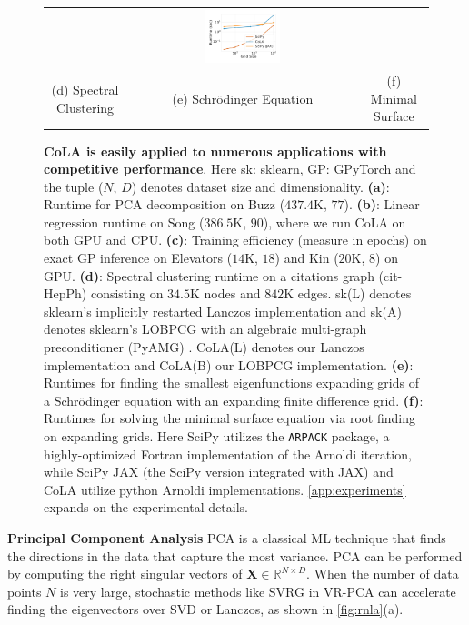 \documentclass{article}
\newcommand{\mbf}[1]{{\boldsymbol{\mathbf{#1}}}}
\renewcommand{\bm}{\mbf}
\begin{document}
\begin{figure}[t!]
\begin{tabular}{ccc}
      &
      \hspace{-2em}
    \includegraphics[width=0.34\textwidth]{./figs/minimal_surface.pdf}
    \vspace{-1.2em}
    \\
    (d) Spectral Clustering & (e) Schr\"{o}dinger Equation & (f) Minimal Surface
    \end{tabular}
    \caption{
        \textbf{CoLA is easily applied to numerous applications with competitive performance}.
        Here sk: sklearn, GP: GPyTorch and the tuple ($N$, $D$) denotes dataset size and dimensionality.
      \textbf{(a)}: Runtime for PCA decomposition on Buzz ($437.4$K, $77$).
      \textbf{(b)}: Linear regression runtime on Song ($386.5$K, $90$), where we run CoLA on both GPU and CPU.
      \textbf{(c)}: Training efficiency (measure in epochs) on exact GP inference on Elevators ($14$K, $18$) and Kin ($20$K, $8$) on GPU.
      \textbf{(d)}: Spectral clustering runtime on a citations graph (cit-HepPh) consisting on $34.5$K nodes and $842$K edges.
      sk(L) denotes sklearn's implicitly restarted Lanczos implementation and sk(A) denotes sklearn's LOBPCG with an algebraic multi-graph preconditioner (PyAMG) \citep{pyamg2023, knyazev2000lobpcg}.
      CoLA(L) denotes our Lanczos implementation and CoLA(B) our LOBPCG implementation.
      \textbf{(e)}: Runtimes for finding the smallest eigenfunctions expanding grids of a Schr\"{o}dinger equation with an expanding finite difference grid.
      \textbf{(f)}: Runtimes for solving the minimal surface equation via root finding on expanding grids. Here SciPy utilizes the \texttt{ARPACK} package,
      a highly-optimized Fortran implementation of the Arnoldi iteration,
      while SciPy JAX (the SciPy version integrated with JAX) and CoLA utilize python Arnoldi implementations.
      \autoref{app:experiments} expands on the experimental details.
    }
    \vspace{-1.5em}
    \label{fig:results}
\end{figure}

\textbf{Principal Component Analysis} \quad
PCA is a classical ML technique that finds the directions in the data that capture the most variance. PCA can be performed by computing the right singular vectors of  $\bm{X} \in \mathbb{R}^{N\times D}$. When the number of data points $N$ is very large, stochastic methods like SVRG in VR-PCA \citep{shamir2015stochastic} can accelerate finding the eigenvectors over SVD or Lanczos, as shown in \autoref{fig:rnla}(a).
\end{document}
